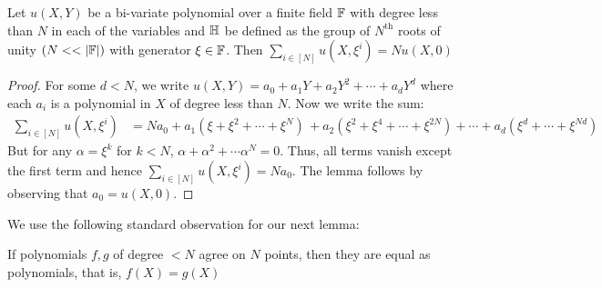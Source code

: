 \begin{comment}
    But $$p(\xi^{\alpha})=\prod_{i \in K}(\xi^{\alpha}-\xi^i)=\prod_{i \in K'\setminus \{\alpha\}}(\xi^{\alpha}-\xi^i)$$ and $$p'(\xi^{\alpha})=\sum_{j \in K} \prod_{i \in K \setminus \{j\}}(\xi^{\alpha}-\xi^i)=\sum_{j \in K'\setminus \{\alpha\}} \prod_{i \in K' \setminus \{j, \alpha\}}(\xi^{\alpha}-\xi^i)$$
    But now, note that $$\sum_{j \in K'\setminus \{\alpha\}} \prod_{i \in K' \setminus \{j, \alpha\}}(\xi^{\alpha}-\xi^i)=\prod_{i \in K' \setminus \{ \alpha\}}(\xi^{\alpha}-\xi^i)\sum_{j \in K'\setminus \{\alpha\}}\frac{1}{\xi^{\alpha}-\xi^j}$$
    So, $$\frac{2p'(\xi^{\alpha})}{p(\xi^{\alpha})}=\frac{2\cdot \prod_{i \in K' \setminus \{ \alpha\}}(\xi^{\alpha}-\xi^i)\sum_{j \in K'\setminus \{\alpha\}}\frac{1}{\xi^{\alpha}-\xi^j}}{\prod_{i \in K'\setminus \{\alpha\}}(\xi^{\alpha}-\xi^i)}=$$\\
    $$=2\cdot\sum_{j \in K'\setminus \{\alpha\}}\frac{1}{\xi^{\alpha}-\xi^j}$$

    This completes the proof of case 2 and thus the proof of the lemma.
\end{comment}

\begin{lemma}[Sumcheck]\label{lem:sumcheck}
Let $u(X,Y)$ be a bi-variate polynomial over a finite field $\mathbb{F}$ with degree less than $N$ in each of the variables and
$\mathbb{H}$ be defined as the group of $N^{\text{th}}$ roots of unity $(N<<|\F|)$
with generator $\xi \in \mathbb{F}$. Then $\sum_{i\in [N]}u(X,\xi^i)= Nu(X,0)$
\end{lemma}

\begin{proof}
    For some $d<N$, we write $u(X,Y)=a_0+a_1 Y+ a_2 Y^2+\cdots+ a_d Y^d$
    where each $a_i$ is a polynomial in $X$ of degree less than $N$.
    Now we write the sum:
    \begin{align*}
        \sum_{i\in [N]}u(X,\xi^i) &= N a_0+a_1(\xi+\xi^2+\cdots+\xi^N) 
        \, +a_2(\xi^2+\xi^4+\cdots+\xi^{2N})+ \cdots + a_d(\xi^d+\cdots +\xi^{Nd})
    \end{align*}
    But for any $\alpha=\xi^k$ for $k<N$, $\alpha+\alpha^2+\cdots \alpha^N=0$. Thus, all terms vanish except the first term
    and hence $\sum_{i\in [N]}u(X,\xi^i)=N a_0$.
    The lemma follows by observing that $a_0=u(X, 0)$.
\end{proof}

We use the following standard observation for our next lemma:
\begin{fact}
	If polynomials $f,g$ of degree $<N$ agree on $N$ points, then they are equal as polynomials, that is, $f(X)=g(X)$
\end{fact}

